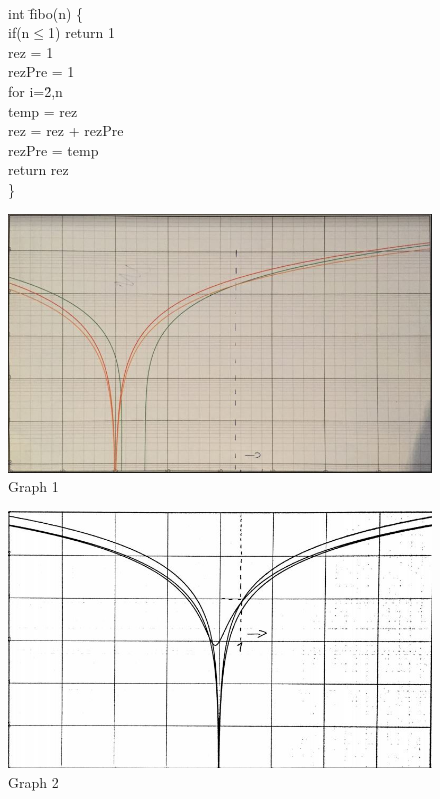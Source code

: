 \documentclass{article}
\begin{document}
{\begin{figure}[ht]
\begin{center}
\begin{tabbing}
 \\
\indent int \=fibo(n) \{ \\
\indent \>if(n$\leq$1) return 1 \\
\indent \>rez = 1 \hspace{3.5cm}{\it O(n)} \\
\indent \>rezPre = 1 \\
\indent \>for i=\=2,n \\
\indent \>\>temp = rez \\
\indent \>\>rez = rez + rezPre \\
\indent \>\>rezPre = temp \\
\indent \>return rez \\
\indent \}
\end{tabbing}
\label{fig_alg_ex}
\end{center}
\end{figure}


\begin{figure}[h]
\centering
\caption{Graph 1}
\includegraphics[width=1.2\textwidth]{graph1}
\end{figure}

\begin{figure}[h]
\centering
\caption{Graph 2}
\includegraphics[width=1.2\textwidth]{graph2}
\end{figure}



}
\end{document}
